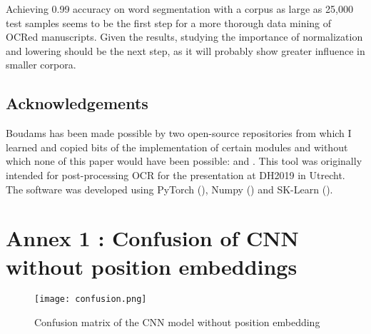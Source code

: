 \documentclass{jdmdh}
\begin{document}
Achieving 0.99 accuracy on word segmentation with a corpus as large as 25,000 test samples seems to be the first step for a more thorough data mining of OCRed manuscripts. Given the results, studying the importance of normalization and lowering should be the next step, as it will probably show greater influence in smaller corpora. 

\subsection{Acknowledgements}

Boudams has been made possible by two open-source repositories from which I learned and copied bits of the implementation of certain modules and without which none of this paper would have been possible: \citet{enrique_manjavacas_2019_2654987} and \citet{bentrevett}. This tool was originally intended for post-processing OCR for the presentation \citet{pinchecampsclerice} at DH2019 in Utrecht. The software was developed using PyTorch (\cite{pytorch}), Numpy (\cite{numpy}) and SK-Learn (\cite{pedregosa2011scikit}).






\appendix\footnotesize

\section{Annex 1 : Confusion of CNN without position embeddings}

\begin{figure}[H]
  \centering
  \texttt{[image: confusion.png]}
  \caption{Confusion matrix of the CNN model without position embedding}
  \label{fig:confusion_matrix}
\end{figure}
\end{document}
